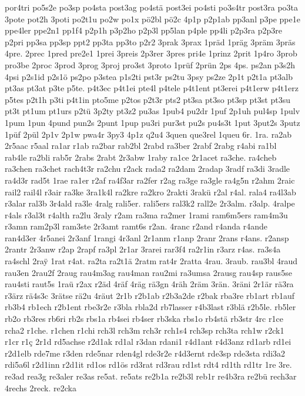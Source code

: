 {por4tri
po5s2e
po3sp
po4sta
post3ag
po4stä
post3ei
po4sti
po3s4tr
post3ra
po3ta
3pote
pot2h
3poti
po2t1u
po2w
po1x
pö2bl
pö2c
4p1p
p2p1ab
pp3anl
p3pe
ppe1e
ppe4ler
ppe2n1
pp1f4
p2p1h
p3p2ho
p2p3l
pp5lan
p4ple
pp4li
p2p3ra
p2p3re
p2pri
pp3sa
pp3sp
ppt2
pp3ta
pp3to
p2r2
3prak
3prax
1präd
1präg
3präm
3präs
4pre.
2prec
1pred
pre2e1
1prei
3preis
2p3rer
3pres
pri4e
1prinz
2prit
1p4ro
3prob
pro3be
2proc
3prod
3prog
3proj
pro3st
3proto
1prüf
2prün
2ps
4ps.
ps2an
p3s2h
4psi
p2s1id
p2s1ö
ps2po
p3stea
p1s2ti
pst3r
ps2tu
3psy
ps2ze
2p1t
p2t1a
pt3alb
pt3as
pt3at
p3te
p5te.
p4t3ec
p4t1ei
pte4l
p4tele
p4t1ent
pt3erei
p4t1erw
p4t1erz
p5tes
p2t1h
p3ti
p4t1in
pto5me
p2tos
p2t3r
pts2
pt3sa
pt3so
pt3sp
pt3st
pt3su
pt3t
pt1um
pt1urs
p2tü
3p2ty
pt3z2
pu3as
1pub4
pu2dr
1puf
2p1uh
pul4sp
1pulv
1pum
1pun
4pund
pun2s
2punt
1pup
pu3ri
pur3st
pu2s
pu4s3t
1put
3put2s
3putz
1püf
2pül
2p1v
2p1w
pwa4r
3py3
4p1z
q2u4
3quen
que3rel
1queu
6r.
1ra.
ra2ab
2r5aac
r5aal
ra1ar
r1ab
ra2bar
rab2bl
2rabd
ra3ber
2rabf
2rabg
r4abi
ra1bl
rab4le
ra2bli
rab5r
2rabs
2rabt
2r3abw
1raby
ra1ce
2r1acet
ra3che.
ra4cheb
ra3chen
ra3chet
rach4t3r
ra2chu
r2ack
rada2
ra2dam
2radap
3radf
ra3di
3radle
ra4d3r
rad5t
1rae
ra1er
r2af
ra4f3ar
ra2fer
r2ag
ra3ge
ra3gle
ra4g5n
r2ahm
2raic
rail2
rail4l
r3air
ra3ke
3ra1k4l
ra2kre
ra2kro
2rakti
3rakü
r2al
r4al.
rala4
ra4l3ab
r3alar
ral3b
3r4ald
ra3le
4ralg
rali5er.
rali5ers
ral3k2
rall2e
2r3alm.
r3alp.
4ralpe
r4als
r3al3t
r4alth
ra2lu
3raly
r2am
ra3ma
ra2mer
1rami
ram6m5ers
ram4m3u
r3amn
ram2p3l
ram3ste
2r3amt
ramt6s
r2an.
4ranc
r2and
r4anda
r4ande
ran4d3er
4r5anei
2r3anf
1rangi
4r3anl
2r1anm
r1anp
2ranr
2rans
r4ans.
r2ansp
2rantr
2r3anw
r2ap
2rapf
ra3pl
2r1ar
3rarei
rar3f4
ra2r1in
r3arz
r4as.
ra3s4a
ra4schl
2ra^^ff
1rat
r4at.
ra2ta
ra2t1ä
2ratm
rat4r
2ratta
4rau.
3raub.
rau3bl
4raud
rau3en
2rau2f
2raug
rau4m3ag
rau4man
rau2mi
ra3umsa
2rausg
rau4sp
raus5se
rau4sti
raut5s
1raü
r2ax
r2äd
4räf
4räg
rä3gn
4räh
2räm
3rän.
3räni
2r1är
rä3ra
r3ärz
rä4s3c
3rätse
rä2u
4räut
2r1b
r2b1ab
r2b3a2de
r2bak
rba3re
rb1art
rb1auf
rb3b4
rb1ech
r2b1ent
rbe3r2e
r3bla
rbla2d
rb7lasser
r4b3last
r3blä
r2b5le.
rb5ler
rb2o
rb3res
rb6ri
rb2s
rbs1a
rb4sei
rb4ser
rb3ska
rbs1o
rb4stä
rb3str
4rc
r1ce
rcha2
r1che.
r1chen
r1chi
rch3l
rch3m
rch3r
rch1s4
rch3sp
rch3ta
rch1w
r2ck1
r1cr
r1ç
2r1d
rd5achse
r2d1ak
rd1al
r3dan
rdani1
r4d1ant
r4d3anz
rd1arb
rd1ei
r2d1elb
rde7me
r3den
rde5nar
rden4gl
rde3r2e
r4d3ernt
rde3sp
rde3sta
rdi3a2
rdi5a6l
r2d1inn
r2d1it
rd1os
rd1ös
rd3rat
rd3rau
rd1st
rdt4
rd1th
rd1tr
1re
3re.
re3ad
rea3g
re3aler
re3as
re5at.
re5ats
re2b1a
re2b3l
reb1r
re4b3ra
re2bü
rech3ar
4rechs
2reck.
re2cka
}
